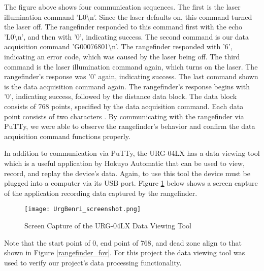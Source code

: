 The figure above shows four communication sequences. The first is the laser illumination command 'L0\textbackslash{}n'. Since the laser defaults on, this command turned the laser off. The rangefinder responded to this command first with the echo 'L0\textbackslash{}n', and then with '0', indicating success. The second command is our data acquisition command 'G00076801\textbackslash{}n'. The rangefinder responded with '6', indicating an error code, which was caused by the laser being off. The third command is the laser illumination command again, which turns on the laser. The rangefinder's response was '0' again, indicating success. The last command shown is the data acquisition command again. The rangefinder's response begins with '0', indicating success, followed by the distance data block. The data block consists of 768 points, specified by the data acquisition command. Each data point consists of two characters \cite{urg04lx_datasheet}. By communicating with the rangefinder via PuTTy, we were able to observe the rangefinder's behavior and confirm the data acquisition command functions properly.
\par
In addition to communication via PuTTy, the URG-04LX has a data viewing tool which is a useful application by Hokuyo Automatic that can be used to view, record, and replay the device's data. Again, to use this tool the device must be plugged into a computer via its USB port. Figure \ref{URGBenriStandard_pic} below shows a screen capture of the application recording data captured by the rangefinder.

\begin{figure}[H]
	\centerline{\texttt{[image: UrgBenri\_screenshot.png]}}
	\caption{Screen Capture of the URG-04LX Data Viewing Tool \cite{URGBenriStandard_ref}}
	\label{URGBenriStandard_pic}
\end{figure}

Note that the start point of 0, end point of 768, and dead zone align to that shown in Figure \ref{rangefinder_fov}. For this project the data viewing tool was used to verify our project's data processing functionality.